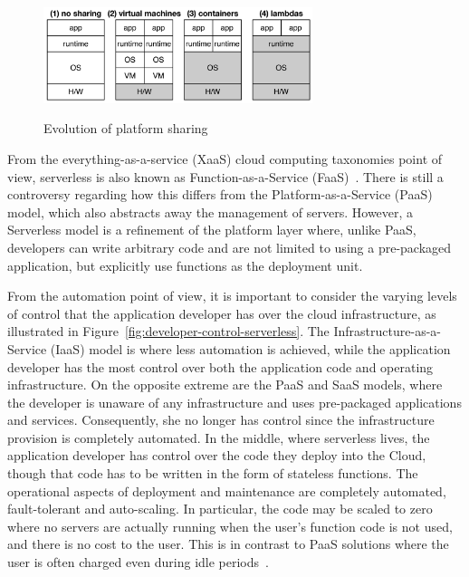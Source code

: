 \begin{figure}
  \centering
    \includegraphics[width=0.7\textwidth]{figs/evolution-platform-sharing.png}
    \label{fig:Evolution-of-Sharing}
    \caption{Evolution of platform sharing~\cite{hendrickson2016serverless}}
\end{figure}


From the everything-as-a-service (XaaS) cloud computing taxonomies point of view, serverless is also known as Function-as-a-Service (FaaS)~\cite{2 MateosFaas}. There is still a controversy regarding how this differs from the Platform-as-a-Service (PaaS) model, which also abstracts away the management of servers. However, a Serverless model is a refinement of the platform layer where, unlike PaaS, developers can write arbitrary code and are not limited to using a pre-packaged application, but explicitly use functions as the deployment unit. 


From the automation point of view, it is important to consider the varying levels of control that the application developer has over the cloud infrastructure, as illustrated in Figure~\ref{fig:developer-control-serverless}. The Infrastructure-as-a-Service (IaaS) model is where less automation is achieved, while the application developer has the most control over both the application code and operating infrastructure. On the opposite extreme are the PaaS and SaaS models, where the developer is unaware of any infrastructure and uses pre-packaged applications and services. Consequently, she no longer has control since the infrastructure provision is completely automated. In the middle, where serverless lives, the application developer has control over the code they deploy into the Cloud, though that code has to be written in the form of stateless functions.  The operational aspects of deployment and maintenance are completely automated, fault-tolerant and
auto-scaling. In particular, the code may be scaled to zero where no servers are actually running when the user's function code is not used, and there is no cost to the user. This is in contrast to PaaS solutions where the user is often charged even during idle periods~\cite{baldini2017serverless}.

